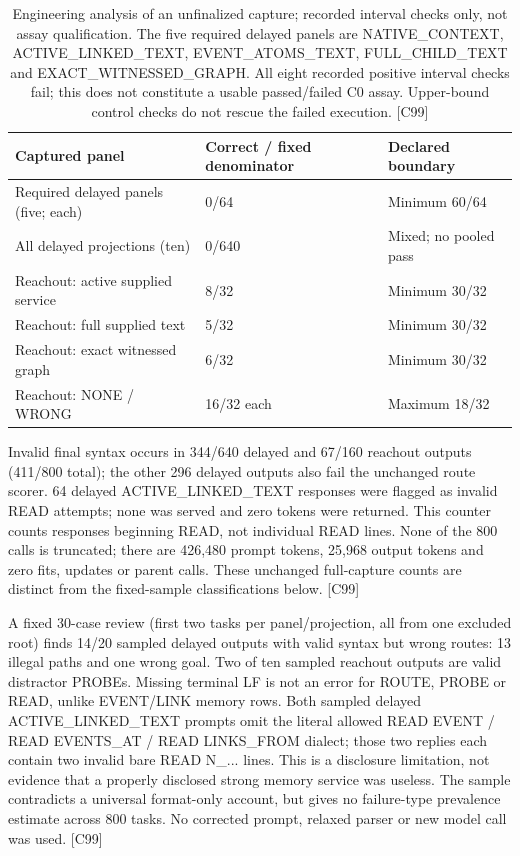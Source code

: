 \documentclass{article}
\begin{document}
\begin{table}[ht]
\centering\small
\begin{tabular}{lll}
\toprule
Captured panel & Correct / fixed denominator & Declared boundary \\
\midrule
Required delayed panels (five; each) & 0/64 & Minimum 60/64 \\
All delayed projections (ten) & 0/640 & Mixed; no pooled pass \\
Reachout: active supplied service & 8/32 & Minimum 30/32 \\
Reachout: full supplied text & 5/32 & Minimum 30/32 \\
Reachout: exact witnessed graph & 6/32 & Minimum 30/32 \\
Reachout: NONE / WRONG & 16/32 each & Maximum 18/32 \\
\bottomrule
\end{tabular}
\caption{Engineering analysis of an unfinalized capture; recorded interval
checks only, not assay qualification. The five required delayed
panels are NATIVE\_CONTEXT, ACTIVE\_LINKED\_TEXT, EVENT\_ATOMS\_TEXT,
FULL\_CHILD\_TEXT and EXACT\_WITNESSED\_GRAPH. All eight recorded positive
interval checks fail; this does not constitute a usable passed/failed C0
assay. Upper-bound control checks do not rescue the failed execution. [C99]}
\end{table}

Invalid final syntax occurs in 344/640 delayed and 67/160 reachout outputs
(411/800 total); the other 296 delayed outputs also fail the unchanged route
scorer. 64 delayed ACTIVE\_LINKED\_TEXT responses were flagged as invalid READ
attempts; none was served and zero tokens were returned. This counter counts
responses beginning READ, not individual READ lines. None of the 800 calls is truncated;
there are 426,480 prompt tokens, 25,968 output tokens and zero fits, updates or
parent calls. These unchanged full-capture counts are distinct from the
fixed-sample classifications below. [C99]

A fixed 30-case review (first two tasks per panel/projection, all from one
excluded root) finds 14/20 sampled delayed outputs with valid syntax but wrong
routes: 13 illegal paths and one wrong goal. Two of ten sampled reachout outputs
are valid distractor PROBEs. Missing terminal LF is not an error for ROUTE,
PROBE or READ, unlike EVENT/LINK memory rows. Both sampled delayed ACTIVE\_LINKED\_TEXT
prompts omit the literal allowed READ EVENT / READ EVENTS\_AT / READ LINKS\_FROM
dialect; those two replies each contain two invalid bare READ N\_... lines. This is a
disclosure limitation, not evidence that a properly disclosed strong memory
service was useless. The sample contradicts a universal format-only account,
but gives no failure-type prevalence estimate across 800 tasks. No corrected
prompt, relaxed parser or new model call was used. [C99]
\end{document}
